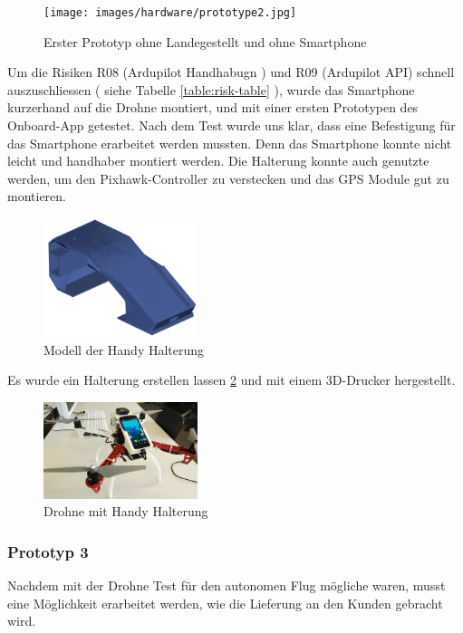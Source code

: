 \begin{figure}[H]
\centering
\texttt{[image: images/hardware/prototype2.jpg]}
\caption{Erster Prototyp ohne Landegestellt und ohne Smartphone}
\label{fig:prototyp-2}
\end{figure}

Um die Risiken R08 (Ardupilot Handhabugn ) und R09 (Ardupilot API) schnell auszuschliessen ( siehe Tabelle \ref{table:risk-table} ), wurde das Smartphone kurzerhand auf die Drohne montiert, und mit einer ersten Prototypen des Onboard-App getestet. 
Nach dem Test wurde uns klar, dass eine Befestigung für das Smartphone erarbeitet werden mussten. 
Denn das Smartphone konnte nicht leicht und handhaber montiert werden. Die Halterung konnte auch genutzte werden, um den Pixhawk-Controller zu verstecken und das GPS Module gut zu montieren. 


\begin{figure}[H]
	\centering
	\includegraphics[width=0.4\textwidth] {images/hardware/case-model.png}
	\caption{Modell der Handy Halterung}
	\label{fig:case-model}
\end{figure}
Es wurde ein Halterung erstellen lassen \ref{fig:case-model} und mit einem 3D-Drucker hergestellt. 
\begin{figure}[H]
	\centering
	\includegraphics[width=0.4\textwidth] {images/hardware/drone-with-handy.jpg}
	\caption{Drohne mit Handy Halterung}
	\label{fig:prototyp-3}
\end{figure}

\subsubsection{Prototyp 3}

Nachdem mit der Drohne Test für den autonomen Flug mögliche waren, musst eine Möglichkeit erarbeitet werden, wie die Lieferung an den Kunden gebracht wird.

